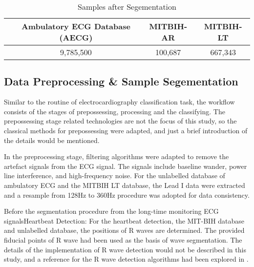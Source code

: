 \documentclass{bmcart}
\begin{document}

\begin{table}[!htbp]
\begin{center}
\begin{threeparttable}
\caption{Samples after Segementation}
\label{table2}
\begin{tabular}{cccc}
\hline
& Ambulatory ECG Database (AECG) & MITBIH-AR &  MITBIH-LT\\
\hline
& 9,785,500 & 100,687 &  667,343 \\
\hline
\end{tabular}
\end{threeparttable}
\end{center}
\end{table}

\subsection*{Data Preprocessing \& Sample Segementation}
Similar to the routine of electrocardiography classification task, the workflow consists of the stages of prepossessing, processing  and the classifying. The prepossessing stage related technologies are not the focus of this study, so the classical methods for prepossessing were adapted, and just a brief introduction of the details would be mentioned. 

In the preprocessing stage, filtering algorithms were adapted to remove the artefact signals from the ECG signal. The signals include baseline wander, power line interference, and high-frequency noise. For the unlabelled database of ambulatory ECG and the MITBIH LT database, the Lead I data were extracted and a resample from 128Hz to 360Hz procedure was adopted for data consistency.

Before the segmentation procedure from the long-time monitoring ECG signalsHeartbeat Detection: For the heartbeat detection, the MIT-BIH database and unlabelled database, the positions of R waves are determined. The provided fiducial points of R wave had been used as the basis of wave segmentation. The details of the implementation of R wave detection would not be described in this study, and a reference for the R wave detection algorithms had been explored in \cite{afonso}.
\end{document}
